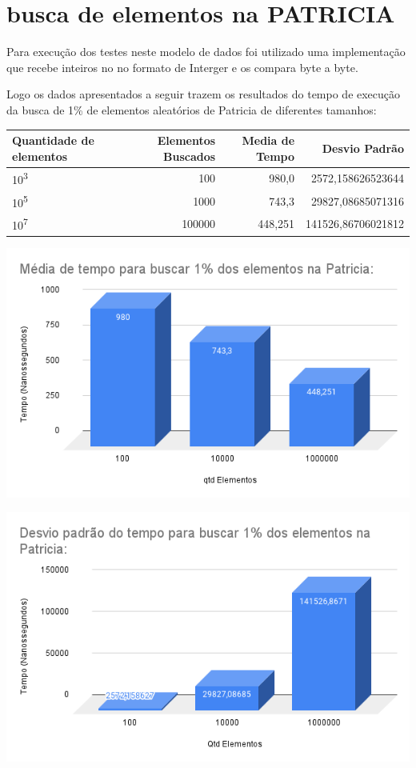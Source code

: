 \section{busca de elementos na PATRICIA}

Para execução dos testes neste modelo de dados foi utilizado uma implementação que recebe inteiros no no formato de Interger e os compara byte a byte\cite{nivioziviani}.

Logo os dados apresentados a seguir trazem os resultados do tempo de execução da
busca de 1\% de elementos aleatórios de Patricia de diferentes tamanhos:

\begin{center}
        \begin{tabular}{| l | r | r | r | }
            \hline
            Quantidade de elementos & Elementos Buscados & Media de Tempo & Desvio Padrão\\
            \hline
            10\textsuperscript{3} & 100 & 980,0 & 2572,158626523644\\
            10\textsuperscript{5} & 1000 & 743,3 & 29827,08685071316\\
            10\textsuperscript{7} & 100000 & 448,251 & 141526,86706021812\\
            \hline
        \end{tabular}
    \end{center}
    
    \begin{center}
            \includegraphics[scale=0.6]{Trabalho AED/fig/Média de tempo para buscar 1 dos elementos na Patricia_.png}
            \label{fig:Media de tempo Trie}
    \end{center}
    
\begin{center}
            \includegraphics[scale=0.6]{Trabalho AED/fig/Desvio padrão do tempo para buscar 1 dos elementos na Patricia_.png}
            \label{fig:Media de tempo Trie}
    \end{center}